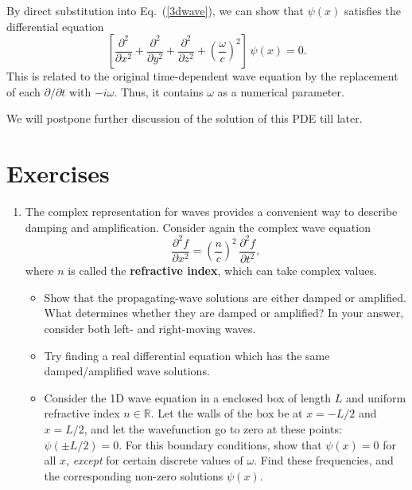 \documentclass[10pt,a4paper]{article}
\begin{document}
By direct substitution into Eq.~(\ref{3dwave}), we can show that
$\psi(x)$ satisfies the differential equation
\begin{equation}
  \left[\frac{\partial^2}{\partial x^2} + \frac{\partial^2}{\partial y^2}
    + \frac{\partial^2}{\partial z^2}
    + \left(\frac{\omega}{c}\right)^2\right] \, \psi(x) = 0.
\end{equation}
This is related to the original time-dependent wave equation by the
replacement of each $\partial/\partial t$ with $-i\omega$. Thus, it
contains $\omega$ as a numerical parameter.

We will postpone further discussion of the solution of this PDE till
later.

\section{Exercises}

\begin{enumerate}
\item
The complex representation for waves provides a convenient way to
describe damping and amplification. Consider again the complex wave
equation
\begin{equation}
  \frac{\partial^2 f}{\partial x^2}
  = \left(\frac{n}{c}\right)^2 \, \frac{\partial^2 f}{\partial t^2},
\end{equation}
where $n$ is called the \textbf{refractive index}, which can take
complex values.

\begin{itemize}
\item
Show that the propagating-wave solutions are either damped or amplified.
What determines whether they are damped or amplified? In your answer,
consider both left- and right-moving waves.

\item
Try finding a real differential equation which has the same
damped/amplified wave solutions.

\item
Consider the 1D wave equation in a enclosed box of length $L$ and
uniform refractive index $n\in\mathbb{R}$. Let the walls of the box be
at $x = -L/2$ and $x = L/2$, and let the wavefunction go to zero at
these points: $\psi(\pm L/2) = 0$. For this boundary conditions, show
that $\psi(x) = 0$ for all $x$, \emph{except} for certain discrete
values of $\omega$. Find these frequencies, and the corresponding
non-zero solutions $\psi(x)$.
\end{itemize}
\end{enumerate}
\end{document}
